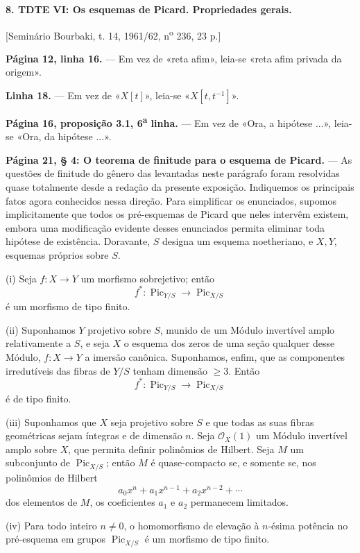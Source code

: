 \documentclass[11pt,twoside,openany]{book}
\numberwithin{equation}{section}
\newcommand{\src}[1]{%
  \phantomsection\hypertarget{src:#1}{}%
  \marginpar{\raggedleft\footnotesize\sffamily #1}%
}
\theoremstyle{plain}
\theoremstyle{definition}
\theoremstyle{remark}
\newcommand{\FgaUnitKey}{frontmatter}
\renewcommand{\src}[1]{%
  \phantomsection\hypertarget{src:\FgaUnitKey:#1}{}%
  \marginpar{\raggedleft\footnotesize\sffamily #1}%
}
\begin{document}
\noindent\textbf{8. TDTE VI: Os esquemas de Picard. Propriedades gerais.}

\begin{center}
[Seminário Bourbaki, t. 14, 1961/62, n\textsuperscript{o} 236, 23 p.]
\end{center}

\noindent\textbf{Página 12, linha 16.} --- Em vez de «reta afim», leia-se
«reta afim privada da origem».

\noindent\textbf{Linha 18.} --- Em vez de «$X[t]$», leia-se
«$X[t,t^{-1}]$».

\noindent\textbf{Página 16, proposição 3.1, 6\textsuperscript{a} linha.} ---
Em vez de «Ora, a hipótese ...», leia-se «Ora, da hipótese ...».

\noindent\textbf{Página 21, § 4: O teorema de finitude para o esquema de
Picard.} --- As questões de finitude do gênero das levantadas neste parágrafo
foram resolvidas quase totalmente desde a redação da presente exposição.
Indiquemos os principais fatos agora conhecidos nessa direção. Para simplificar
os enunciados, supomos implicitamente que todos os pré-esquemas de Picard que
neles intervêm existem, embora uma modificação evidente desses enunciados
permita eliminar toda hipótese de existência. Doravante, $S$ designa um esquema
noetheriano, e $X,Y$, esquemas próprios sobre $S$.

\medskip
\noindent(i) Seja $f:X\longrightarrow Y$ um morfismo sobrejetivo; então
\[
f^*: \operatorname{Pic}_{Y/S}\longrightarrow\operatorname{Pic}_{X/S}
\]
é um morfismo de tipo finito.
\src{304}
\noindent(ii) Suponhamos $Y$ projetivo sobre $S$, munido de um Módulo
invertível amplo relativamente a $S$, e seja $X$ o esquema dos zeros de uma
seção qualquer desse Módulo, $f:X\longrightarrow Y$ a imersão canônica.
Suponhamos, enfim, que as componentes irredutíveis das fibras de $Y/S$ tenham
dimensão $\geq3$. Então
\[
f^*: \operatorname{Pic}_{Y/S}\longrightarrow\operatorname{Pic}_{X/S}
\]
é de tipo finito.

\noindent(iii) Suponhamos que $X$ seja projetivo sobre $S$ e que todas as suas
fibras geométricas sejam íntegras e de dimensão $n$. Seja
$\mathcal O_X(1)$ um Módulo invertível amplo sobre $X$, que permita definir
polinômios de Hilbert. Seja $M$ um subconjunto de
$\operatorname{Pic}_{X/S}$; então $M$ é quase-compacto se, e somente se, nos
polinômios de Hilbert
\[
a_0x^n+a_1x^{n-1}+a_2x^{n-2}+\cdots
\]
dos elementos de $M$, os coeficientes $a_1$ e $a_2$ permanecem limitados.

\noindent(iv) Para todo inteiro $n\neq0$, o homomorfismo de elevação à
$n$-ésima potência no pré-esquema em grupos $\operatorname{Pic}_{X/S}$ é um
morfismo de tipo finito.
\end{document}
